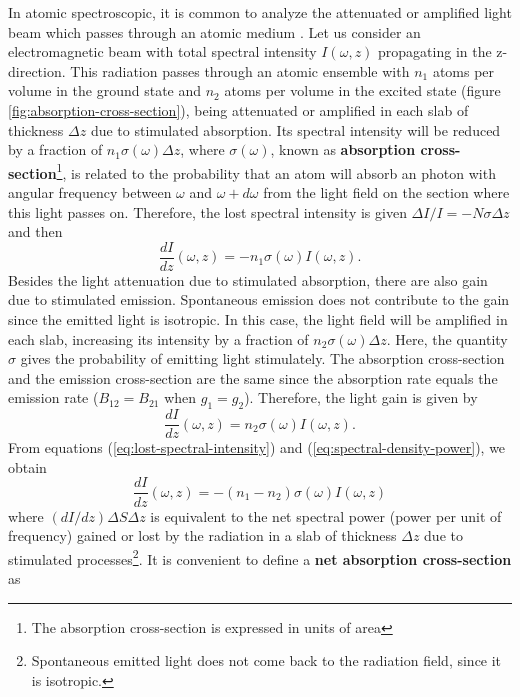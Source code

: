 In atomic spectroscopic, it is common to analyze the attenuated or amplified light beam which passes through an atomic medium \cite{reinaudi2007strong, smith2011absorption, shu2004absorption}. Let us consider an electromagnetic beam with total spectral intensity $ I(\omega, z) $ propagating in the z-direction. This radiation passes through an atomic ensemble with $ n_1 $ atoms per volume in the ground state and $ n_2 $ atoms per volume in the excited state (figure \ref{fig:absorption-cross-section}), being attenuated or amplified in each slab of thickness $ \Delta z $ due to stimulated absorption. Its spectral intensity will be reduced by a fraction of $ n_1 \sigma(\omega) \Delta z $, where $ \sigma(\omega) $, known as \textbf{absorption cross-section}\footnote{The absorption cross-section is expressed in units of area}, is related to the probability that an atom will absorb an photon with angular frequency between $ \omega $ and $ \omega + d\omega $ from the light field on the section where this light passes on. Therefore, the lost spectral intensity is given $ \Delta I / I = - N \sigma \Delta z $ and then
\begin{equation}
	\frac{dI}{dz}(\omega, z) = - n_1 \sigma(\omega) I(\omega, z).
	\label{eq:lost-spectral-intensity}
\end{equation}
Besides the light attenuation due to stimulated absorption, there are also gain due to stimulated emission. Spontaneous emission does not contribute to the gain since the emitted light is isotropic. In this case, the light field will be amplified in each slab, increasing its intensity by a fraction of $ n_2 \sigma(\omega) \Delta z $. Here, the quantity $ \sigma $ gives the probability of emitting light stimulately. The absorption cross-section and the emission cross-section are the same since the absorption rate equals the emission rate ($ B_{12} = B_{21} $ when $ g_1 = g_2 $). Therefore, the light gain is given by
\begin{equation}
	\frac{dI}{dz}(\omega, z) = n_2 \sigma(\omega) I(\omega, z).
	\label{eq:spectral-density-power}
\end{equation}
From equations (\ref{eq:lost-spectral-intensity}) and (\ref{eq:spectral-density-power}), we obtain
\begin{equation}
	\frac{dI}{dz}(\omega, z) = - (n_1 - n_2) \sigma(\omega) I(\omega, z)
	\label{eq:net-spectral-density-power}
\end{equation}
where $ (dI / dz) \Delta S \Delta z $ is equivalent to the net spectral power (power per unit of frequency) gained or lost by the radiation in a slab of thickness $ \Delta z $ due to stimulated processes\footnote{Spontaneous emitted light does not come back to the radiation field, since it is isotropic.}. It is convenient to define a \textbf{net absorption cross-section} as 
